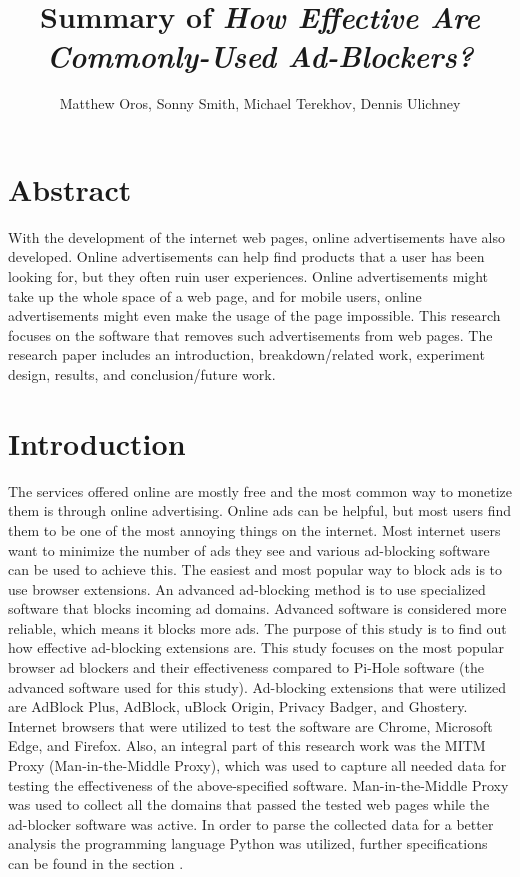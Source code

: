 \documentclass[sigsmall]{acmart}
\title{Summary of \emph{How Effective Are Commonly-Used Ad-Blockers?}}
\author{Matthew Oros, Sonny Smith, Michael Terekhov, Dennis Ulichney}
\begin{document}
\maketitle


\section*{Abstract}
With the development of the internet web pages, online advertisements have also developed. Online advertisements can help find products that a user has been looking for, but they often ruin user experiences. Online advertisements might take up the whole space of a web page, and for mobile users, online advertisements might even make the usage of the page impossible. This research focuses on the software that removes such advertisements from web pages. The research paper includes an introduction, breakdown/related work, experiment design, results, and conclusion/future work.  

\section*{Introduction}
The services offered online are mostly free and the most common way to monetize them is through online advertising. Online ads can be helpful, but most users find them to be one of the most annoying things on the internet. Most internet users want to minimize the number of ads they see and various ad-blocking software can be used to achieve this. The easiest and most popular way to block ads is to use browser extensions. An advanced ad-blocking method is to use specialized software that blocks incoming ad domains. Advanced software is considered more reliable, which means it blocks more ads. The purpose of this study is to find out how effective ad-blocking extensions are. This study focuses on the most popular browser ad blockers and their effectiveness compared to Pi-Hole software (the advanced software used for this study). Ad-blocking extensions that were utilized are AdBlock Plus, AdBlock, uBlock Origin, Privacy Badger, and Ghostery. Internet browsers that were utilized to test the software are Chrome, Microsoft Edge, and Firefox. Also, an integral part of this research work was the MITM Proxy (Man-in-the-Middle Proxy), which was used to capture all needed data for testing the effectiveness of the above-specified software. Man-in-the-Middle Proxy was used to collect all the domains that passed the tested web pages while the ad-blocker software was active. In order to parse the collected data for a better analysis the programming language Python was utilized, further specifications can be found in the section . 
\end{document}
